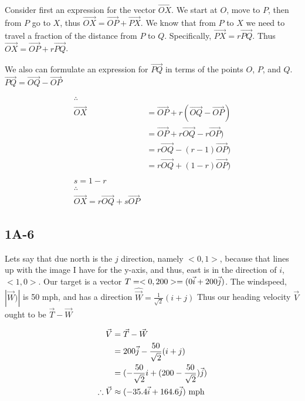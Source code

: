\documentclass[main.tex]{subfiles}
\begin{document}
    Consider first an expression for the vector $\vec{OX}$.
    We start at $O$, move to $P$, then from $P$ go to $X$,
    thus $\vec{OX} = \vec{OP} + \vec{PX}$.
    We know that from $P$ to $X$ we need to travel a fraction of the
    distance from $P$ to $Q$. Specifically, $\vec{PX} = r\vec{PQ}$.
    Thus $\vec{OX} = \vec{OP} + r\vec{PQ}$.

    We also can formulate an expression for $\vec{PQ}$ in terms
    of the points $O$, $P$, and $Q$. $\vec{PQ} = \vec{OQ} - \vec{OP}$


    \begin{align*}
    \therefore\\
        \vec{OX} &= \vec{OP} + r(\vec{OQ} - \vec{OP})\\
        &= \vec{OP} + r\vec{OQ} - r\vec{OP})\\
        &= r\vec{OQ} - (r-1)\vec{OP})\\
        &= r\vec{OQ} + (1-r)\vec{OP})\\
        \\
        s = 1 - r\\
        \therefore\\
        \vec{OX} = r\vec{OQ} + s\vec{OP}
    \end{align*}

\subsection*{1A-6}

Lets say that due north is the $j$ direction, namely $<0,1>$,
because that lines up with the image I have for the y-axis, and
thus, east is in the direction of $i$, $<1,0>$.
Our target is a vector $T = <0, 200> = (0\vec{i} + 200\vec{j})$.
The windspeed, $|\vec{W})|$ is 50 mph, and has a direction $\hat{\vec
{W}} = \frac{1}{\sqrt{2}}(i + j)$
Thus our heading velocity $\vec{V}$ ought to be $\vec{T} - \vec{W}$

\begin{align}
\vec{V} &= \vec{T} - \vec{W}\\
&= 200\vec{j} - \frac{50}{\sqrt{2}}(i+j)\\
&= (- \frac{50}{\sqrt{2}}i + (200  - \frac{50}{\sqrt{2}}) \vec{j})\\
\therefore \vec{V} &\approx (- 35.4 \vec{i} + 164.6 \vec{j})\ \text{mph}
\end{align}
\end{document}
